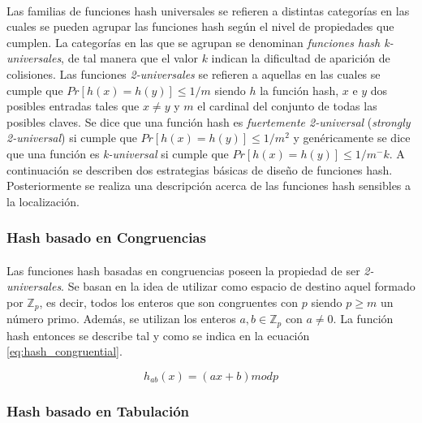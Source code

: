 \documentclass{subfiles}
\begin{document}
        \paragraph{}
        Las familias de funciones hash universales se refieren a distintas categorías en las cuales se pueden agrupar las funciones hash según el nivel de propiedades que cumplen. La categorías en las que se agrupan se denominan \emph{funciones hash k-universales}, de tal manera que el valor $k$ indican la dificultad de aparición de colisiones. Las funciones \emph{2-universales} se refieren a aquellas en las cuales se cumple que $Pr[h(x) = h(y)] \leq 1/m$ siendo $h$ la función hash, $x$ e $y$ dos posibles entradas tales que $x \neq y$ y $m$ el cardinal del conjunto de todas las posibles claves. Se dice que una función hash es \emph{fuertemente 2-universal} (\emph{strongly 2-universal}) si cumple que $Pr[h(x) = h(y)] \leq 1/m^2$ y genéricamente se dice que una función es \emph{k-universal} si cumple que $Pr[h(x) = h(y)] \leq 1/m^-k$. A continuación se describen dos estrategias básicas de diseño de funciones hash. Posteriormente se realiza una descripción acerca de las funciones hash sensibles a la localización.

        \subsubsection{Hash basado en Congruencias}
        \label{sec:hash_congruential}

          \paragraph{}
          Las funciones hash basadas en congruencias poseen la propiedad de ser \emph{2-universales}. Se basan en la idea de utilizar como espacio de destino aquel formado por $\mathbb{Z}_p$, es decir, todos los enteros que son congruentes con $p$ siendo $p \geq m$ un número primo. Además, se utilizan los enteros $a,b \in \mathbb{Z}_p$ con $a \neq 0$. La función hash entonces se describe tal y como se indica en la ecuación \eqref{eq:hash_congruential}.

          \begin{equation}
          \label{eq:hash_congruential}
            h_{ab}(x) = (ax + b) mod p
          \end{equation}

        \subsubsection{Hash basado en Tabulación}
        \label{sec:hasch_tabulation}
\end{document}
